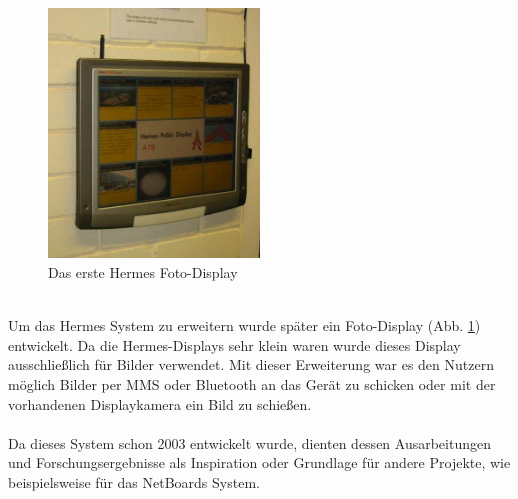 \begin{figure}[h!]
  \centering
  \includegraphics[width=0.5\textwidth]{./img/hermes_photoDisplay_short.png}
  \caption{Das erste Hermes Foto-Display\cite{cheverest:2012}}
  \label{img:hermesPhotoDisplay}
\end{figure}
\\
Um das Hermes System zu erweitern wurde später ein Foto-Display (Abb. \ref{img:hermesPhotoDisplay}) entwickelt\cite{cheveres:2005:hermes-bluetooth}. Da die Hermes-Displays sehr klein waren wurde dieses Display ausschließlich für Bilder verwendet.
Mit dieser Erweiterung war es den Nutzern möglich Bilder per MMS oder Bluetooth an das Gerät zu schicken oder mit der vorhandenen Displaykamera ein Bild zu schießen.
\\
\\
Da dieses System schon 2003 entwickelt wurde, dienten dessen Ausarbeitungen und Forschungsergebnisse als Inspiration oder Grundlage für andere Projekte, wie beispielsweise für das NetBoards System. 

